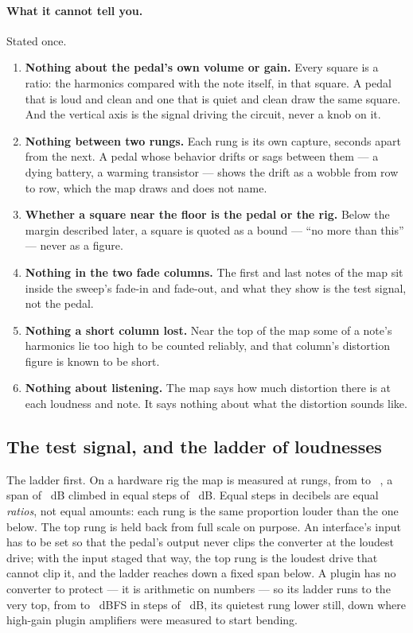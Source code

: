 \documentclass[11pt,a4paper]{article}
\begin{document}
\paragraph{What it cannot tell you.} Stated once.
\begin{enumerate}
  \item \textbf{Nothing about the pedal's own volume or gain.} Every
  square is a ratio: the harmonics compared with the note itself, in that
  square. A pedal that is loud and clean and one that is quiet and clean
  draw the same square. And the vertical axis is the signal driving the
  circuit, never a knob on it.
  \item \textbf{Nothing between two rungs.} Each rung is its own capture,
  seconds apart from the next. A pedal whose behavior drifts or sags
  between them --- a dying battery, a warming transistor --- shows the
  drift as a wobble from row to row, which the map draws and does not
  name.
  \item \textbf{Whether a square near the floor is the pedal or the rig.}
  Below the margin described later, a square is quoted as a bound ---
  ``no more than this'' --- never as a figure.
  \item \textbf{Nothing in the two fade columns.} The first and last notes
  of the map sit inside the sweep's fade-in and fade-out, and what they
  show is the test signal, not the pedal.
  \item \textbf{Nothing a short column lost.} Near the top of the map some
  of a note's harmonics lie too high to be counted reliably, and that
  column's distortion figure is known to be short.
  \item \textbf{Nothing about listening.} The map says how much distortion
  there is at each loudness and note. It says nothing about what the distortion sounds like.
\end{enumerate}

\subsection{The test signal, and the ladder of loudnesses}

The ladder first. On a hardware rig the map is measured at
\gmLevels{} rungs, from \gmHardwareFloorDBFS{} to
\gmHardwareCeilingDBFS{}~, a span of \gmHardwareTravelDB{}~dB
climbed in equal steps of \journeyHardwareStep{}~dB. Equal steps in
decibels are equal \emph{ratios}, not equal amounts: each rung is the same
proportion louder than the one below. The top rung is held back from full
scale on purpose. An interface's input has to be set so that the pedal's
output never clips the converter at the loudest drive; with the input
staged that way, the top rung is the loudest drive that cannot clip it,
and the ladder reaches down a fixed span below. A plugin has no
converter to protect --- it is arithmetic on numbers --- so its ladder
runs to the very top, from \gmPluginFloorDBFS{} to
\gmPluginCeilingDBFS{}~dBFS in steps of \journeyPluginStep{}~dB, its
quietest rung lower still, down where high-gain plugin amplifiers were
measured to start bending.
\end{document}
